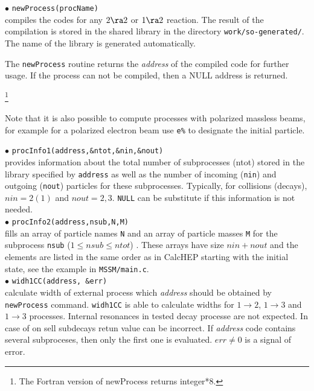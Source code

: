\documentclass[12pt,a4paper]{article}
\begin{document}
\noindent
$\bullet$ \verb|newProcess(procName)|\\
compiles the  codes for any $2\ra 2$ or  $1\ra 2$  reaction.
The result of the compilation is stored in the  shared library  in the directory \verb|work/so-generated/|. The name of the library is generated
automatically.

The \verb|newProcess| routine returns the
{\it address} of the compiled code for further usage.   If the
process can not be compiled, then a NULL address is
returned. {\footnote{The  Fortran version of  newProcess returns integer*8. }


Note that it is also possible to compute processes with polarized massless beams, 
for example for a polarized electron beam use \verb|e%| to designate the initial
particle.



\noindent
$\bullet$ \verb|procInfo1(address,&ntot,&nin,&nout)|\\
provides information  about the total number of subprocesses
(ntot) stored in the library  specified by {\tt address} as well
as the number of incoming (\verb|nin|) and outgoing (\verb|nout|) particles for
these subprocesses. Typically, for collisions (decays), $nin=2(1)$ and $nout=2,3$.
\verb|NULL| can be substitute if this information is not needed. \\
$\bullet$ \verb|procInfo2(address,nsub,N,M)|\\
fills an array of
particle names \verb|N| and an array of particle  masses \verb|M| for the subprocess \verb|nsub| ($1\leq nsub \leq ntot$) . These
arrays have size $nin+nout$ and the elements are listed in the same order
as in CalcHEP starting with the initial state, see the example in 
\verb|MSSM/main.c|.\\

$\bullet$ \verb|widh1CC(address, &err)|\\
calculate width of external process which {\it address} should be obtained
by {\tt newProcess} command. {\tt widh1CC} is able to calculate widths for   $1\to2$,
$1\to3$ and $1\to3$ processes. Internal resonances in  tested decay
processe are not expected. In case of on sell subdecays retun value  can be
incorrect. If {\it address} code contains several  subproceses, then
only the first one is evaluated.  $err \ne 0$ is a signal of error. 



}
\end{document}
